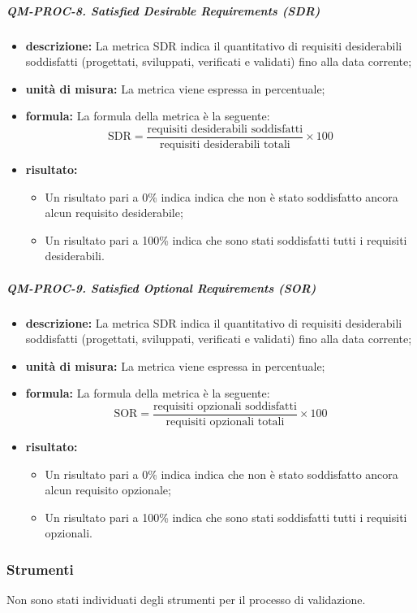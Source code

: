 			\subparagraph{QM-PROC-8. Satisfied Desirable Requirements (SDR)}

			\begin{itemize}
      			\item \textbf{descrizione: }
				La metrica SDR indica il quantitativo di requisiti desiderabili soddisfatti (progettati, sviluppati, verificati e validati) fino alla data corrente;

				\item \textbf{unità di misura: }
				La metrica viene espressa in percentuale;

				\item \textbf{formula: }
				La formula della metrica è la seguente:
				\[
					\text{SDR} = \frac{\text{requisiti desiderabili soddisfatti}}{\text{requisiti desiderabili totali}} \times 100
				\]

				\item \textbf{risultato: }
				\begin{itemize}
					\item Un risultato pari a 0\% indica indica che non è stato soddisfatto ancora alcun requisito desiderabile;
					\item Un risultato pari a 100\% indica che sono stati soddisfatti tutti i requisiti desiderabili.
				\end{itemize}
			\end{itemize}

			\subparagraph{QM-PROC-9. Satisfied Optional Requirements (SOR)}

			\begin{itemize}
      			\item \textbf{descrizione: }
				La metrica SDR indica il quantitativo di requisiti desiderabili soddisfatti (progettati, sviluppati, verificati e validati) fino alla data corrente;

				\item \textbf{unità di misura: }
				La metrica viene espressa in percentuale;

				\item \textbf{formula: }
				La formula della metrica è la seguente:
				\[
					\text{SOR} = \frac{\text{requisiti opzionali soddisfatti}}{\text{requisiti opzionali totali}} \times 100
				\]

				\item \textbf{risultato: }
				\begin{itemize}
					\item Un risultato pari a 0\% indica indica che non è stato soddisfatto ancora alcun requisito opzionale;
					\item Un risultato pari a 100\% indica che sono stati soddisfatti tutti i requisiti opzionali.
				\end{itemize}
			\end{itemize}
                
    \subsubsection{Strumenti}
        Non sono stati individuati degli strumenti per il processo di validazione.